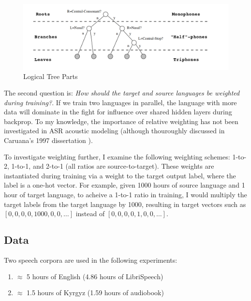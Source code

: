 \documentclass[a4paper]{article}
\begin{document}
\begin{figure}[!htbp]
  \centering
{}
  \includegraphics[width=\linewidth]{figs-1/levels.png}
  \caption{Logical Tree Parts}
  \label{fig:tree-parts}
\endminipage\hfill
\end{figure}



The second question is: \textit{How should the target and source languages be weighted during training?}. If we train two languages in parallel, the language with more data will dominate in the fight for influence over shared hidden layers during backprop. To my knowledge, the importance of relative weighting has not been investigated in ASR acoustic modeling (although thouroughly discussed in Caruana's 1997 dissertation \cite{caruana1997}).

To investigate weighting further, I examine the following weighting schemes: 1-to-2, 1-to-1, and 2-to-1 (all ratios are source-to-target). These weights are instantiated during training via a weight to the target output label, where the label is a one-hot vector. For example, given 1000 hours of source language and 1 hour of target language, to acheive a 1-to-1 ratio in training, I would multiply the target labels from the target language by 1000, resulting in target vectors such as \texttt{$[0, 0, 0, 0, 1000, 0, 0, \ldots]$} instead of \texttt{$[0, 0, 0, 0, 1, 0, 0, \ldots]$}.



\subsection{Data}

Two speech corpora are used in the following experiments:

\begin{enumerate}
\item $\approx$ 5 hours of English (4.86 hours of LibriSpeech)
\item $\approx$ 1.5 hours of Kyrgyz (1.59 hours of audiobook)
\end{enumerate}
\end{document}
